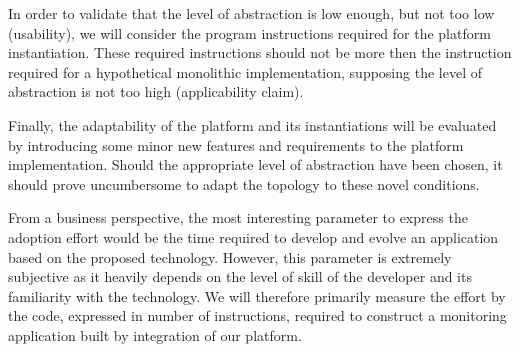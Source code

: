 In order to validate that the level of abstraction is low enough, but not too low (usability), we will consider the program instructions required for the platform instantiation. These required instructions should not be more then the instruction required for a hypothetical monolithic implementation, supposing the level of abstraction is not too high (applicability claim). 

Finally, the adaptability of the platform and its instantiations will be evaluated by introducing some minor new features and requirements to the platform implementation. Should the appropriate level of abstraction have been chosen, it should prove uncumbersome to adapt the topology to these novel conditions.

From a business perspective, the most interesting parameter to express the adoption effort would be the time required to develop and evolve an application based on the proposed technology. However, this parameter is extremely subjective as it heavily depends on the level of skill of the developer and its familiarity with the technology. We will therefore primarily measure the effort by the code, expressed in number of instructions, required to construct a monitoring application built by integration of our platform. 


